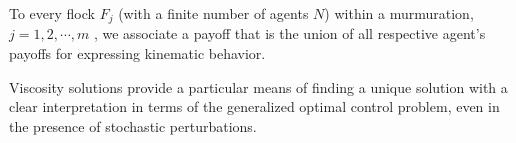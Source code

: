 
\begin{definition}
	To every flock $F_j$ (with a finite number of agents $N$) within a murmuration, $j = 1, 2, \cdots, m$ , we associate a payoff that is the union of all respective agent's payoffs for expressing kinematic behavior. %
	\label{def:payoff}
\end{definition}
%
%
%
%
Viscosity solutions provide a particular means of finding a unique solution with a clear interpretation in terms of the generalized optimal control problem, even in the presence of stochastic perturbations. 
%
